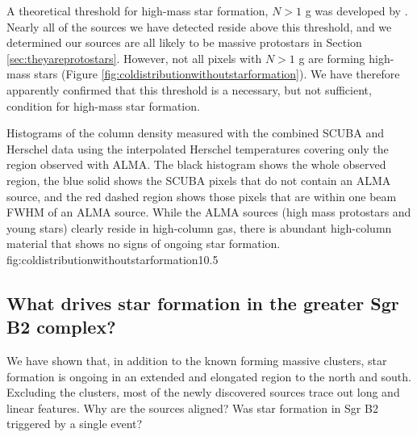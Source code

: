 \documentclass[twocolumn]{aastex61}
\begin{document}
A theoretical threshold for high-mass star formation, $N > 1$ g \persc was
developed by \citet{Krumholz2008a}.   Nearly all of the sources we have
detected reside above this threshold, and we determined our sources are all
likely to be massive protostars in Section \ref{sec:theyareprotostars}.
However, not all pixels with $N > 1$ g \persc are forming high-mass stars
(Figure \ref{fig:coldistributionwithoutstarformation}).  We
have therefore apparently confirmed that this threshold is a necessary, but not
sufficient, condition for high-mass star formation.



{Histograms of the column density measured with the combined SCUBA and Herschel
data using the interpolated Herschel temperatures covering only the region
observed with ALMA.  The black histogram shows the whole observed region,
the blue solid shows the SCUBA pixels that do not contain an ALMA source,
and the red dashed region shows those pixels that are within one beam
FWHM of an ALMA source.  While the ALMA sources (high mass protostars and young
stars)
clearly reside in high-column gas, there is abundant high-column material
that shows no signs of ongoing star formation.}
{fig:coldistributionwithoutstarformation}{1}{0.5\textwidth}

\subsection{What drives star formation in the greater Sgr B2 complex?}
\label{sec:whatdrives}
We have shown that, in addition to the known forming massive clusters,
star formation is ongoing in an extended and elongated region to the north
and south.  Excluding the clusters, most of the newly discovered sources
trace out long and linear features.  Why are the sources aligned?
Was star formation in Sgr B2 triggered by a single event?
\end{document}
